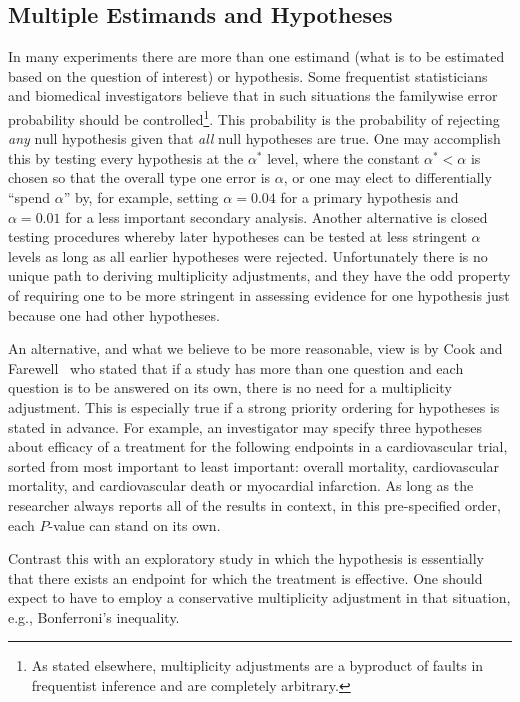 \subsection{Multiple Estimands and Hypotheses}
In many experiments there are more than one estimand (what is to be
estimated based on the question of interest) or hypothesis.  Some
frequentist statisticians and biomedical investigators believe that in such
situations the familywise error probability should be
controlled\footnote{As stated elsewhere, multiplicity adjustments are
  a byproduct of faults in frequentist inference and are completely arbitrary.}.
This probability is the probability of rejecting \emph{any} null
hypothesis given that \emph{all} null hypotheses are true.  One may
accomplish this by testing every hypothesis at the $\alpha^{*}$ level,
where the constant $\alpha^{*} < \alpha$ is chosen so that the overall
type one error is $\alpha$, or one may elect to
differentially ``spend $\alpha$'' by, for example, setting $\alpha=0.04$ for a
primary hypothesis and $\alpha=0.01$ for a less important secondary
analysis.  Another alternative is closed testing procedures whereby
later hypotheses can be tested at less stringent $\alpha$ levels as
long as all earlier hypotheses were rejected.  Unfortunately there is
no unique path to deriving multiplicity adjustments, and they have the
odd property of requiring one to be more stringent in assessing
evidence for one hypothesis just because one had other hypotheses.

An alternative, and what we believe to be more reasonable, view is by
Cook and Farewell~\cite{coo96mul} who stated that if a study has more
than one question and each question is to be answered on its own,
there is no need for a multiplicity adjustment.  This is especially
true if a strong priority ordering for hypotheses is stated in
advance.  For example, an investigator may specify three hypotheses about
efficacy of a treatment for the following
endpoints in a cardiovascular trial, sorted from most important to
least important: overall mortality, cardiovascular mortality,
and cardiovascular death or myocardial infarction.  As long as the
researcher always reports all of the results in context, in this
pre-specified order, each $P$-value can stand on its own.

Contrast this with an exploratory study in which the hypothesis is
essentially that there exists an endpoint for which the treatment is
effective.  One should expect to have to employ a conservative
multiplicity adjustment in that situation, e.g., Bonferroni's inequality.

